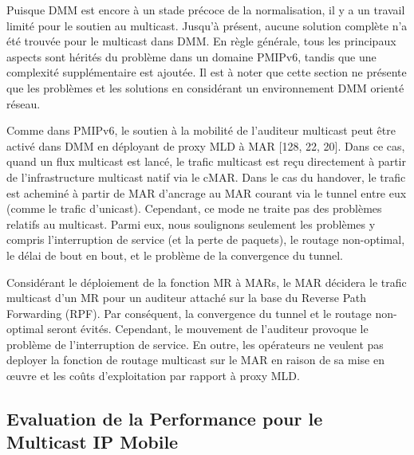 Puisque DMM est encore à un stade précoce de la normalisation, il y a un travail limité pour le soutien au multicast. Jusqu'à présent, aucune solution complète n’a été trouvée pour le multicast dans DMM. En règle générale, tous les principaux aspects sont hérités du problème dans un domaine PMIPv6, tandis que une complexité supplémentaire est ajoutée. Il est à noter que cette section ne présente que les problèmes et les solutions en considérant un environnement DMM orienté réseau.

Comme dans PMIPv6, le soutien à la mobilité de l'auditeur multicast peut être activé dans DMM en déployant de proxy MLD à MAR [128, 22, 20]. Dans ce cas, quand un flux multicast est lancé, le trafic multicast est reçu directement à partir de l'infrastructure multicast natif via le cMAR. Dans le cas du handover, le trafic est acheminé à partir de MAR d'ancrage au MAR courant via le tunnel entre eux (comme le trafic d'unicast). Cependant, ce mode ne traite pas des problèmes relatifs au multicast. Parmi eux, nous soulignons seulement les problèmes y compris l'interruption de service (et la perte de paquets), le routage non-optimal, le délai de bout en bout, et le problème de la convergence du tunnel. 

Considérant le déploiement de la fonction MR à MARs, le MAR décidera le trafic multicast d'un MR pour un auditeur attaché sur la base du Reverse Path Forwarding (RPF). Par conséquent, la convergence du tunnel et le routage non-optimal seront évités. Cependant, le mouvement de l'auditeur provoque le problème de l'interruption de service. En outre, les opérateurs ne veulent pas deployer la fonction de routage multicast sur le MAR en raison de sa mise en œuvre et les coûts d'exploitation par rapport à proxy MLD.


\subsection{Evaluation de la Performance pour le Multicast IP Mobile}
